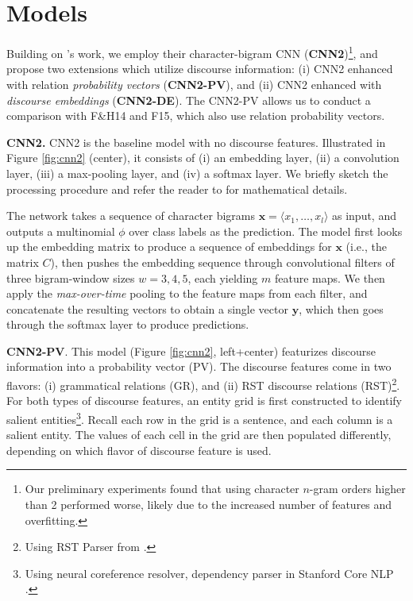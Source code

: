 \section{Models}
\label{sec:longer2_models}

Building on 's work,
 we employ their character-bigram CNN (\textbf{CNN2})\footnote{Our preliminary experiments found that using character $n$-gram orders higher than 2 performed worse, likely due to the increased number of features and overfitting.}, and propose two extensions which utilize discourse information:
(i) CNN2 enhanced with relation \emph{probability vectors} (\textbf{CNN2-PV}), and (ii) CNN2 enhanced with \emph{discourse embeddings} (\textbf{CNN2-DE}). 
The CNN2-PV allows us to conduct a comparison with F\&H14 and F15, which also use relation probability vectors. 
\medskip

\noindent
\textbf{CNN2.}
CNN2 is the baseline model with no discourse features. Illustrated in Figure \ref{fig:cnn2} (center), it consists of (i) an embedding layer, (ii) a convolution layer, (iii) a max-pooling layer, and (iv) a softmax layer.
We briefly sketch the processing procedure and refer the reader to \citep[Section 2]{Shrestha:2017} for mathematical details.

The network takes a sequence of character bigrams $\bm{x} = \langle x_1,\ldots,x_l\rangle$ as input, and outputs a multinomial $\phi$ over class labels as the prediction.
The model first looks up the embedding matrix to produce a sequence of embeddings for $\bm{x}$ (i.e., the matrix $C$), then pushes the embedding sequence through convolutional filters of three bigram-window sizes $w=3,4,5$, each yielding $m$ feature maps. 
We then apply the \emph{max-over-time} pooling \cite{Collobert:2011} to the feature maps from each filter, and concatenate the resulting vectors to obtain a single vector $\bm{y}$, which then goes through the softmax layer to produce predictions.


\medskip
\noindent
\textbf{CNN2-PV}.
This model (Figure \ref{fig:cnn2}, left+center) featurizes discourse information into a probability vector (PV). 
The discourse features come in two flavors: (i) grammatical relations (GR), and (ii) RST discourse relations (RST)\footnote{Using RST Parser from \citet{Ji:2014}.}. For both types of discourse features, an entity grid is first constructed to identify salient entities\footnote{Using neural coreference resolver, dependency parser in Stanford Core NLP \cite{Clark:2016}.}. Recall each row in the grid is a sentence, and each column is a salient entity. The values of each cell in the grid are then populated differently, depending on which flavor of discourse feature is used. 

